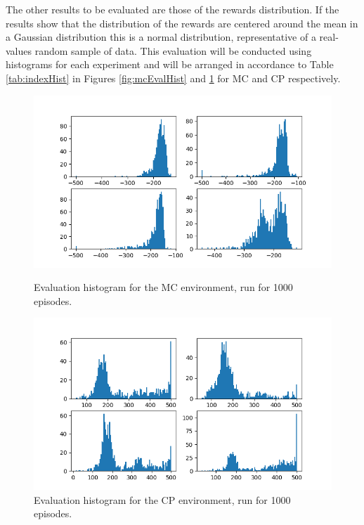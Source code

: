 \documentclass[hidelinks,journal]{IEEEtran}
\begin{document}
The other results to be evaluated are those of the rewards distribution. If the results show that the distribution of the rewards are centered around the mean in a Gaussian distribution this is a normal distribution, representative of a real-values random sample of data. This evaluation will be conducted using histograms for each experiment and will be arranged in accordance to Table \ref{tab:indexHist} in Figures \ref{fig:mcEvalHist} and \ref{fig:cpEvalHist} for MC and CP respectively.

\begin{figure}[t]
  \centering
    \includegraphics[scale=0.5]{graph/mcEvalHist.png}
  \caption{Evaluation histogram for the MC environment, run for 1000 episodes.}
  \label{fig:mcEvalHist}
  \centering
    \includegraphics[scale=0.5]{graph/cpEvalHist.png}
  \caption{Evaluation histogram for the CP environment, run for 1000 episodes.}
  \label{fig:cpEvalHist}
\end{figure}
\end{document}
